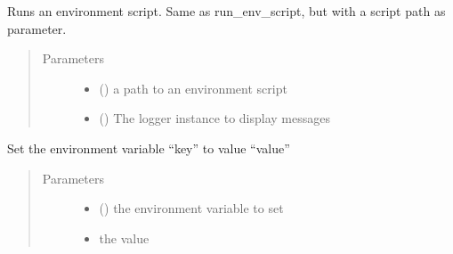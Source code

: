 \documentclass[a4paper,10pt,english]{sphinxmanual}
\begin{document}
\begin{fulllineitems}
\begin{fulllineitems}
\label{\detokenize{commands/apidoc/src:src.environment.SalomeEnviron.run_simple_env_script}}
Runs an environment script. Same as run\_env\_script, but with a 
script path as parameter.
\begin{quote}\begin{description}
\item[{Parameters}] \leavevmode\begin{itemize}
\item {} 
 () \textendash{} a path to an environment script

\item {} 
 () \textendash{} The logger instance to display messages

\end{itemize}

\end{description}\end{quote}

\end{fulllineitems}


\begin{fulllineitems}
\label{\detokenize{commands/apidoc/src:src.environment.SalomeEnviron.set}}
Set the environment variable “key” to value “value”
\begin{quote}\begin{description}
\item[{Parameters}] \leavevmode\begin{itemize}
\item {} 
 () \textendash{} the environment variable to set

\item {} 
 \textendash{} the value

\end{itemize}

\end{description}\end{quote}


\end{fulllineitems}
\end{fulllineitems}
\end{document}
